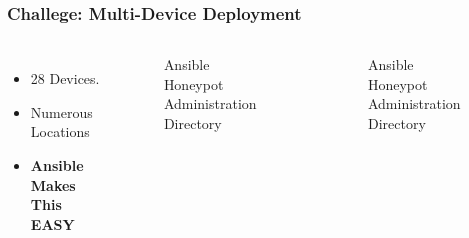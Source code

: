 \begin{frame}
\frametitle{Challege: Multi-Device Deployment}

\begin{columns}
\begin{itemize}[t]
    \item 28 Devices.
    \item Numerous Locations
    \item{\textbf{Ansible Makes This EASY}}
\end{itemize}

\begin{figure}[b]
\caption{Ansible Honeypot Administration Directory}
\end{figure}

\begin{figure}[H]
\caption{Ansible Honeypot Administration Directory}
\end{figure}

\end{columns}

\end{frame}
